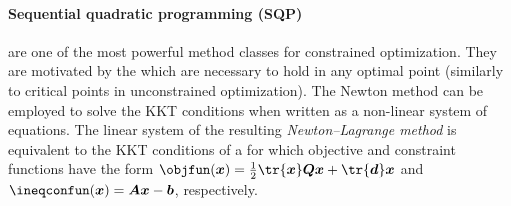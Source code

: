 \paragraph{Sequential quadratic programming (SQP)}

are one of the most powerful method classes for constrained optimization.
They are motivated by the 
which are necessary to hold in any optimal point
(similarly to critical points in unconstrained optimization).
The Newton method can be employed to solve the KKT conditions when
written as a non-linear system of equations.
The linear system of the resulting \emph{Newton--Lagrange method}
is equivalent to the KKT conditions of a
for which objective and constraint functions have the
form $\objfun(\*x) = \frac{1}{2} \tr{\*x} \mat{Q} \*x + \tr{\*d} \*x$ and
$\ineqconfun(\*x) = \mat{A} \*x - \*b$, respectively.
